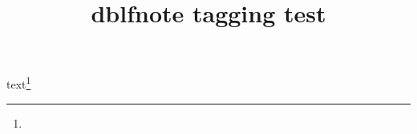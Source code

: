 \documentclass{article}
\title{dblfnote tagging test}
\begin{document}
\kant[1-3]

text\footnote{\kant[1]}
\end{document}
